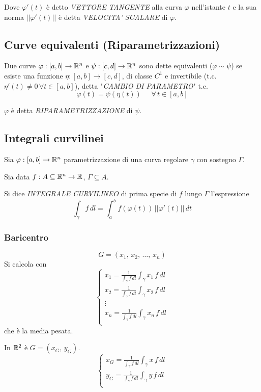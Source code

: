 Dove $\varphi' (t)$ è detto \emph{VETTORE TANGENTE} alla curva $\varphi$ nell'istante $t$ e la sua norma $||\varphi' (t)||$ è detta \emph{VELOCITA' SCALARE} di $\varphi$.

\subsection{Curve equivalenti (Riparametrizzazioni)}
\begin{definition}
    Due curve $\varphi:[a,b] \to \mathbb{R}^n$ e $\psi :[c,d] \to \mathbb{R}^n$ sono dette equivalenti ($\varphi \sim \psi$) se esiste una funzione $\eta : [a,b] \to [c,d]$, di classe $C^1$ e invertibile (t.c. $\eta'(t) \neq 0 \, \forall t \in [a,b]$), detta "\emph{CAMBIO DI PARAMETRO}" t.c.
    \begin{equation}
        \varphi(t) = \psi (\eta(t)) \mspace{25mu} \forall \, t \in [a,b]
    \end{equation}
\end{definition}

\begin{definition}
    $\varphi$ è detta \emph{RIPARAMETRIZZAZIONE} di $\psi$.
\end{definition}

\subsection{Integrali curvilinei}
\begin{definition}
    Sia $\varphi:[a,b] \to \mathbb{R}^n$ parametrizzazione di una curva regolare $\gamma$ con sostegno $\Gamma$.
    
    Sia data $f:A \subseteq \mathbb{R}^n \to \mathbb{R}$, $\Gamma \subseteq A$.

    Si dice \emph{INTEGRALE CURVILINEO} di prima specie di $f$ lungo $\Gamma$ l'espressione
    \begin{equation}
        \int_\gamma f \, dl = \int_a^b f(\varphi(t)) \, ||\varphi'(t)|| \, dt
    \end{equation}
\end{definition}

\subsubsection{Baricentro}
\[
    G = (x_1, \, x_2, \, \dotsc, \, x_n)
\]
Si calcola con
\begin{equation}
    \left\{
    \begin{array}{l}
        x_1 = \frac{1}{\int_\gamma f \, dl} \int_\gamma x_1 \, f\, dl \\
        x_2 = \frac{1}{\int_\gamma f \, dl} \int_\gamma x_2 \, f\, dl \\
        \vdots \\
        x_n = \frac{1}{\int_\gamma f \, dl} \int_\gamma x_n \, f\, dl \\
    \end{array} \right.
\end{equation}
che è la media pesata.

In $\mathbb{R}^2$ è $G = (x_G,\, y_G)$.
\[
    \left\{
    \begin{array}{l}
        x_G = \frac{1}{\int_\gamma f \, dl} \int_\gamma x \, f\, dl \\
        y_G = \frac{1}{\int_\gamma f \, dl} \int_\gamma y \, f\, dl \\
    \end{array} \right.
\]